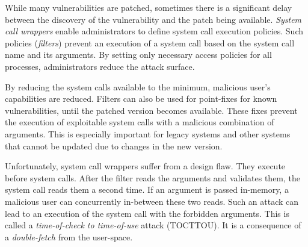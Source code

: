 
While many vulnerabilities are patched, sometimes there is a significant delay
between the discovery of the vulnerability and the patch being available.
\emph{System call wrappers} enable administrators to define system call
execution policies. Such policies (\emph{filters}) prevent an execution of a
system call based on the system call name and its arguments. By setting only
necessary access policies for all processes, administrators reduce the attack
surface.


By reducing the system calls available to the minimum, malicious user's
capabilities are reduced. Filters can also be used for point-fixes for known
vulnerabilities, until the patched version becomes available. These fixes
prevent the execution of exploitable system calls with a malicious combination
of arguments. This is especially important for legacy systems and other systems
that cannot be updated due to changes in the new version.




Unfortunately, system call wrappers suffer from a design flaw. They execute
before system calls. After the filter reads the arguments and validates them,
the system call reads them a second time. If an argument is passed in-memory, a
malicious user can concurrently in-between these two reads. Such an attack can
lead to an execution of the system call with the forbidden arguments. This is
called a \emph{time-of-check to time-of-use} attack (TOCTTOU). It is a
consequence of a \emph{double-fetch} from the user-space.

